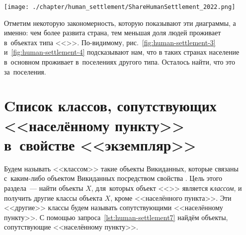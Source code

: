 \begin{figure*}
    \texttt{[image: ./chapter/human\_settlement/ShareHumanSettlement\_2022.png]}
	\label{fig:human-settlement-4}
	\caption[Доля населения страны, проживающего в населённых пунктах, 2022 год.]
            {Доля населения страны, проживающего в~<<населённых пунктах>>, 2022 год. 
            Выбраны страны с~населением более 5~млн~чел. 
            SPARQL-запрос: \href{https://w.wiki/92jq}{https://w.wiki/92jq}}%
\end{figure*}%

Отметим некоторую закономерность, которую показывают эти диаграммы, а именно: 
чем более развита страна, тем меньшая доля людей проживает в~объектах типа 
<<>>. 
По-видимому, рис.~\ref{fig:human-settlement-3} и~\ref{fig:human-settlement-4} 
подсказывают нам, что в таких странах население в~основном проживает 
в~поселениях другого типа. Осталось найти, что это за~поселения. 





\section[Cписок классов, сопутствующих <<населённому пункту>> в~свойстве <<экземпляр>>]{Cписок классов, сопутствующих <<населённому пункту>>\\в~свойстве <<экземпляр>>}
\label{human-settlement:tag1}

Будем называть <<классом>> такие объекты Викиданных, 
которые связаны с~каким-либо объектом Викиданных посредством свойства . 
Цель этого раздела~--- найти объекты $X$, 
для~которых объект <<>> является \emph{классом}, 
и получить другие классы объекта $X$, кроме <<населённого пункта>>. 
Эти <<другие>> классы будем называть сопутствующими <<населённому пункту>>. 
С помощью запроса~\ref{lst:human-settlement7} 
найдём объекты, сопутствующие <<населённому пункту>>. 



